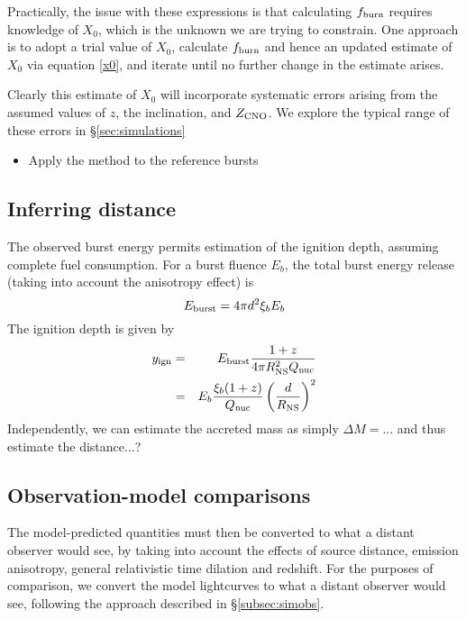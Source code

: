 \documentclass{aastex63}
\begin{document}
Practically, the issue with these expressions is that calculating $f_{\rm burn}$ requires knowledge of $X_0$, which is the unknown we are trying to constrain. One approach is to adopt a trial value of $X_0$, calculate $f_{\rm burn}$ and hence an updated estimate of $X_0$ via equation \ref{x0}, and iterate until no further change in the estimate arises.

Clearly this estimate of $X_0$ will incorporate systematic errors arising from the assumed values of $z$, the inclination, and $Z_{\rm CNO}$. We explore the typical range of these errors in 
\S\ref{sec:simulations}

\begin{itemize}
\item Apply the method to the reference bursts
\end{itemize}


\subsection{Inferring distance} 
\label{subsec:distance}

The observed burst energy permits estimation of the ignition depth, assuming complete fuel consumption. For a burst fluence $E_b$, the total burst energy release (taking into account the anisotropy effect) is
\begin{equation}
E_{\rm burst} = 4\pi d^2 \xi_b E_b 
\end{equation}
The ignition depth is given by 
\begin{eqnarray}
y_{\rm ign} & = & E_{\rm burst}\frac{1 + z}{4\pi R_{\rm NS}^2 Q_{\rm nuc}} \\
  & = & E_b \frac{\xi_b (1 + z)}{ Q_{\rm nuc}} \left(\frac{d}{R_{\rm NS}}\right)^2 
\end{eqnarray}
Independently, we can estimate the accreted mass as simply $\Delta M = ...$ and thus estimate the distance...?

\subsection{Observation-model comparisons} 
\label{subsec:lccompare}

The model-predicted quantities must then be converted to what a distant observer would see, by taking into account the effects of source distance, emission anisotropy, general relativistic time dilation and redshift. For the purposes of comparison, we convert the model lightcurves to what a distant observer would see, following the approach described in \S\ref{subsec:simobs}.
\end{document}
